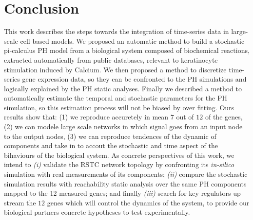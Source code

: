 \section{Conclusion}
This work describes the steps towards the integration of time-series data in large-scale cell-based models. 
We proposed an automatic method to build a stochastic pi-calculus PH model from a biological system composed of biochemical reactions, extracted automatically from public databases, 
relevant to keratinocyte stimulation induced by Calcium. 
We then proposed a method to discretize time-series gene expression data, so they can be confronted to the PH simulations and logically explained by the PH static analyses. 
Finally we described a method to automatically estimate the temporal and stochastic
parameters for the PH simulation, so this estimation process will not be biased by over fitting. Ours results show that: (1) we reproduce accuretely in mean 
$7$ out of $12$ of the genes, (2) we can modele large scale networks in which signal goes from an input node to the output nodes, (3) we can reproduce tendences of the dynamic of components
and take in to accout the stochastic and time aspect of the bihaviours of the biological system.
As concrete perspectives of this work, we intend to \emph{(i)} validate the RSTC network topology by confronting its \emph{in-silico} simulation with real measurements of its components;
\emph{(ii)} compare the stochastic simulation results with reachability static analysis over the same PH components mapped to the $12$ measured genes; and 
finally \emph{(iii)} search for key-regulators up-stream the $12$ genes which will control the dynamics of the system, to  provide our biological partners concrete 
hypotheses to test experimentally.
